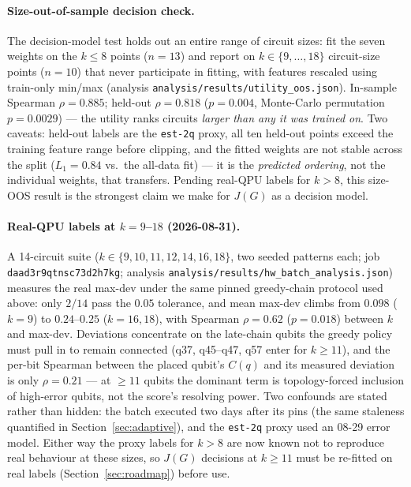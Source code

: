 ﻿\documentclass[12pt,a4paper]{article}
\begin{document}
\paragraph{Size-out-of-sample decision check.} The decision-model test holds out an entire range of circuit sizes: fit the seven weights on the $k\le 8$ points ($n{=}13$) and report on $k\in\{9,\dots,18\}$ circuit-size points ($n{=}10$) that never participate in fitting, with features rescaled using train-only min/max (analysis \texttt{analysis/results/utility\_oos.json}). In-sample Spearman $\rho=0.885$; held-out $\rho=0.818$ ($p=0.004$, Monte-Carlo permutation $p=0.0029$) --- the utility ranks circuits \emph{larger than any it was trained on}. Two caveats: held-out labels are the \texttt{est-2q} proxy, all ten held-out points exceed the training feature range before clipping, and the fitted weights are not stable across the split ($L_1=0.84$ vs.\ the all-data fit) --- it is the \emph{predicted ordering}, not the individual weights, that transfers. Pending real-QPU labels for $k{>}8$, this size-OOS result is the strongest claim we make for $J(G)$ as a decision model.

\paragraph{Real-QPU labels at $k{=}9$--$18$ (2026-08-31).} A 14-circuit suite ($k\in\{9,10,11,12,14,16,18\}$, two seeded patterns each; job \texttt{daad3r9qtnsc73d2h7kg}; analysis \texttt{analysis/results/hw\_batch\_analysis.json}) measures the real max-dev under the same pinned greedy-chain protocol used above: only $2/14$ pass the $0.05$ tolerance, and mean max-dev climbs from $0.098$ ($k{=}9$) to $0.24$--$0.25$ ($k{=}16,18$), with Spearman $\rho{=}0.62$ ($p{=}0.018$) between $k$ and max-dev. Deviations concentrate on the late-chain qubits the greedy policy must pull in to remain connected (q37, q45--q47, q57 enter for $k\ge 11$), and the per-bit Spearman between the placed qubit's $C(q)$ and its measured deviation is only $\rho{=}0.21$ --- at $\ge 11$ qubits the dominant term is topology-forced inclusion of high-error qubits, not the score's resolving power. Two confounds are stated rather than hidden: the batch executed two days after its pins (the same staleness quantified in Section~\ref{sec:adaptive}), and the \texttt{est-2q} proxy used an 08-29 error model. Either way the proxy labels for $k{>}8$ are now known not to reproduce real behaviour at these sizes, so $J(G)$ decisions at $k\ge 11$ must be re-fitted on real labels (Section~\ref{sec:roadmap}) before use.
\end{document}
